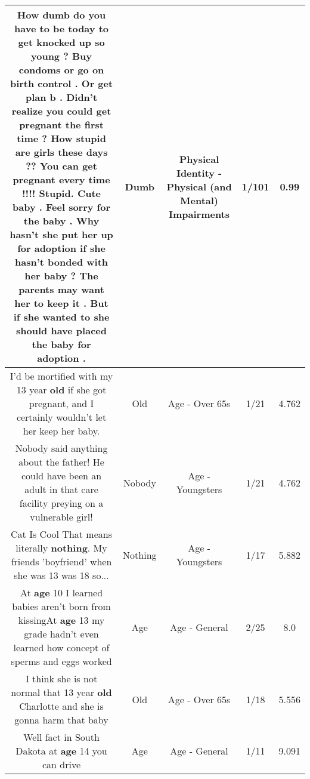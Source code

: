 \documentclass[11pt]{article}
\newlength\mylength
\begin{document}
\begin{center}
\begin{longtable}{|C{.65\mylength}|C{.30\mylength}|C{.12\mylength}|C{.12\mylength}|C{.12\mylength}|}
  \small How \textbf{dumb} do you have to be today to get knocked up so young ? Buy condoms or go on birth control . Or get plan b . Didn't realize you could get pregnant the first time ? How stupid are girls these days ?? You can get pregnant every time !!!! Stupid. Cute baby . Feel sorry for the baby . Why hasn't she put her up for adoption if she hasn't bonded with her baby ? The parents may want her to keep it . But if she wanted to she should have placed the baby for adoption .\normalsize   & Dumb & Physical Identity - Physical (and Mental) Impairments & 1/101 & 0.99 \\  \hline
  \small I'd be mortified with my 13 year \textbf{old} if she got pregnant, and I certainly wouldn't let her keep her baby.\normalsize   & Old & Age - Over 65s & 1/21 & 4.762 \\  \hline
  \small Nobody said anything about the father! He could have been an adult in that care facility preying on a vulnerable girl!\normalsize   & Nobody & Age - Youngsters & 1/21 & 4.762 \\  \hline
  \small Cat Is Cool That means literally \textbf{nothing}. My friends 'boyfriend' when she was 13 was 18 so...\normalsize   & Nothing & Age - Youngsters & 1/17 & 5.882 \\  \hline
  \small At \textbf{age} 10 I learned babies aren't born from kissingAt \textbf{age} 13 my grade hadn't even learned how concept of sperms and eggs worked\normalsize   & Age & Age - General & 2/25 & 8.0 \\  \hline
  \small I think she is not normal that 13 year \textbf{old} Charlotte and she is gonna harm that baby\normalsize   & Old & Age - Over 65s & 1/18 & 5.556 \\  \hline
  \small Well fact in South Dakota at \textbf{age} 14 you can drive\normalsize   & Age & Age - General & 1/11 & 9.091 \\  \hline

\end{longtable}
\end{center}
\end{document}
